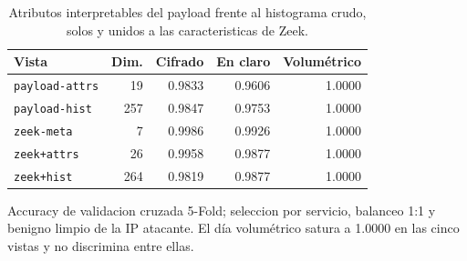 \begin{table}[htbp]
  \centering
  \caption{Atributos interpretables del payload frente al histograma crudo, solos y unidos a las caracteristicas de Zeek.}
  \label{tab:atributos}
  \begin{tabular}{lrrrr}
    \toprule
    \textbf{Vista} & \textbf{Dim.} & \textbf{Cifrado} & \textbf{En claro} & \textbf{Volumétrico} \\
    \midrule
    \texttt{payload-attrs} & 19 & 0.9833 & 0.9606 & 1.0000 \\
    \texttt{payload-hist} & 257 & 0.9847 & 0.9753 & 1.0000 \\
    \texttt{zeek-meta} & 7 & 0.9986 & 0.9926 & 1.0000 \\
    \texttt{zeek+attrs} & 26 & 0.9958 & 0.9877 & 1.0000 \\
    \texttt{zeek+hist} & 264 & 0.9819 & 0.9877 & 1.0000 \\
    \bottomrule
  \end{tabular}
  \par\smallskip\footnotesize{Accuracy de validacion cruzada 5-Fold; seleccion por servicio, balanceo 1:1 y benigno limpio de la IP atacante. El día volumétrico satura a 1.0000 en las cinco vistas y no discrimina entre ellas.}
\end{table}

